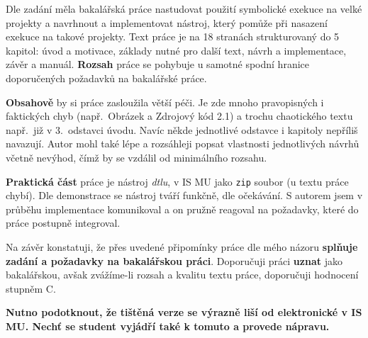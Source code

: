 





Dle zadání měla bakalářská práce nastudovat použití symbolické exekuce na
velké projekty a navrhnout a implementovat nástroj, který pomůže při nasazení
exekuce na takové projekty. Text práce je na 18 stranách strukturovaný do 5
kapitol: úvod a motivace, základy nutné pro další text, návrh a implementace,
závěr a manuál. \textbf{Rozsah} práce se pohybuje u samotné spodní hranice
doporučených požadavků na bakalářské práce.

\textbf{Obsahově} by si práce zasloužila větší péči. Je zde mnoho pravopisných
i faktických chyb (např.\ Obrázek a Zdrojový kód 2.1) a trochu chaotického
textu např.\ již v 3.\ odstavci úvodu.  Navíc někde jednotlivé odstavce i
kapitoly nepříliš navazují.  Autor mohl také lépe a rozsáhleji popsat
vlastnosti jednotlivých návrhů včetně nevýhod, čímž by se vzdálil od
minimálního rozsahu.

\textbf{Praktická část} práce je nástroj \textit{dtlu}, v IS MU jako
\texttt{zip} soubor (u textu práce chybí). Dle demonstrace se nástroj tváří
funkčně, dle očekávání. S autorem jsem v průběhu implementace komunikoval a
on pružně reagoval na požadavky, které do práce postupně integroval.

Na závěr konstatuji, že přes uvedené připomínky práce dle mého názoru
\textbf{splňuje zadání a požadavky na bakalářskou práci}.  Doporučuji práci
\textbf{uznat} jako bakalářskou, avšak zvážíme-li rozsah a kvalitu textu
práce, doporučuji hodnocení stupněm C.

\textbf{Nutno podotknout, že tištěná verze se výrazně liší od elektronické v
IS MU. Nechť se student vyjádří také k tomuto a provede nápravu.}

\botinfo

